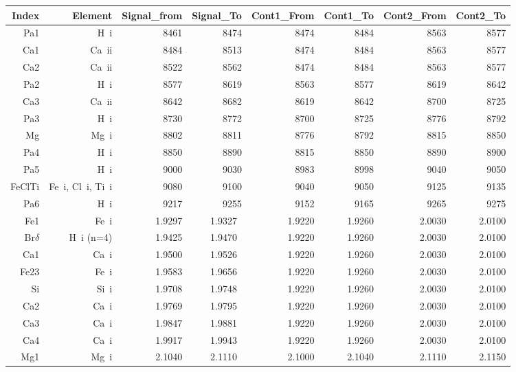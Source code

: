 \begin{table}
\begin{center}
\begin{tabular}{rrrrrrrr}
  \hline
Index & Element & Signal\_from & Signal\_To & Cont1\_From & Cont1\_To & Cont2\_From & Cont2\_To \\ 
  \hline
  Pa1 & H~{\sc i}   & 8461 & 8474 & 8474 & 8484 & 8563 & 8577 \\ 
  Ca1 & Ca~{\sc ii} & 8484 & 8513 & 8474 & 8484 & 8563 & 8577 \\ 
  Ca2 & Ca~{\sc ii} & 8522 & 8562  & 8474 & 8484 & 8563 & 8577 \\ 
  Pa2 & H~{\sc i}   & 8577 & 8619 & 8563 & 8577 & 8619 & 8642 \\ 
  Ca3 & Ca~{\sc ii} & 8642 & 8682 & 8619 & 8642 & 8700 & 8725 \\ 
  Pa3 & H~{\sc i}   & 8730 & 8772 & 8700 & 8725 & 8776 & 8792 \\ 
  Mg  & Mg~{\sc i}  & 8802 & 8811 & 8776 & 8792 & 8815 & 8850 \\ 
  Pa4 & H~{\sc i}   & 8850 & 8890 & 8815 & 8850 & 8890 & 8900 \\ 
  Pa5 & H~{\sc i}   & 9000 & 9030 & 8983 & 8998 & 9040 & 9050 \\
  FeClTi & Fe~{\sc i}, Cl~{\sc i}, Ti~{\sc i} &9080 & 9100 & 9040 & 9050 & 9125 & 9135 \\
  Pa6 & H~{\sc i}   &9217 & 9255 & 9152 & 9165 & 9265 & 9275 \\
Fe1         & Fe{~\sc i}     & 1.9297 & 1.9327~& 1.9220 & 1.9260 & 2.0030 & 2.0100 \\
Br$\delta$  & H{~\sc i} (n=4)& 1.9425 & 1.9470~& 1.9220 & 1.9260 & 2.0030 & 2.0100 \\
Ca1         & Ca{~\sc i}     & 1.9500 & 1.9526~& 1.9220 & 1.9260 & 2.0030 & 2.0100 \\
Fe23        & Fe{~\sc i}     & 1.9583 & 1.9656~& 1.9220 & 1.9260 & 2.0030 & 2.0100 \\
Si          & Si{~\sc i}     & 1.9708 & 1.9748~& 1.9220 & 1.9260 & 2.0030 & 2.0100 \\
Ca2         & Ca{~\sc i}     & 1.9769 & 1.9795~& 1.9220 & 1.9260 & 2.0030 & 2.0100 \\
Ca3         & Ca{~\sc i}     & 1.9847 & 1.9881~& 1.9220 & 1.9260 & 2.0030 & 2.0100 \\
Ca4         & Ca{~\sc i}     & 1.9917 & 1.9943~& 1.9220 & 1.9260 & 2.0030 & 2.0100 \\
Mg1         & Mg{~\sc i}     & 2.1040 & 2.1110~& 2.1000 & 2.1040 & 2.1110 & 2.1150 \\

\end{tabular}
\end{center}
\end{table}
